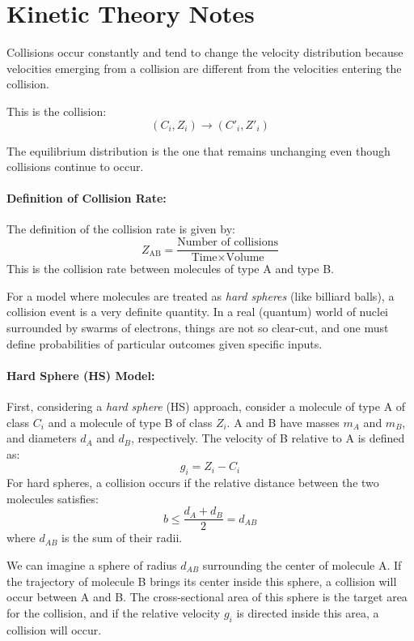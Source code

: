 \documentclass{article}
\begin{document}
\section*{Kinetic Theory Notes}

Collisions occur constantly and tend to change the velocity distribution because velocities emerging from a collision are different from the velocities entering the collision.

This is the collision:
\[
(C_i, Z_i) \longrightarrow (C'_i, Z'_i)
\]

The equilibrium distribution is the one that remains unchanging even though collisions continue to occur.

\paragraph{Definition of Collision Rate:}
The definition of the collision rate is given by:
\[
Z_{\text{AB}} = \frac{\text{Number of collisions}}{\text{Time} \times \text{Volume}}
\]
This is the collision rate between molecules of type A and type B.

For a model where molecules are treated as \emph{hard spheres} (like billiard balls), a collision event is a very definite quantity. In a real (quantum) world of nuclei surrounded by swarms of electrons, things are not so clear-cut, and one must define probabilities of particular outcomes given specific inputs.

\paragraph{Hard Sphere (HS) Model:}
First, considering a \emph{hard sphere} (HS) approach, consider a molecule of type A of class \( C_i \) and a molecule of type B of class \( Z_i \). A and B have masses \( m_A \) and \( m_B \), and diameters \( d_A \) and \( d_B \), respectively. The velocity of B relative to A is defined as:
\[
g_i = Z_i - C_i
\]
For hard spheres, a collision occurs if the relative distance between the two molecules satisfies:
\[
b \leq \frac{d_A + d_B}{2} = d_{AB}
\]
where \( d_{AB} \) is the sum of their radii.

We can imagine a sphere of radius \( d_{AB} \) surrounding the center of molecule A. If the trajectory of molecule B brings its center inside this sphere, a collision will occur between A and B. The cross-sectional area of this sphere is the target area for the collision, and if the relative velocity \( g_i \) is directed inside this area, a collision will occur.
\end{document}
